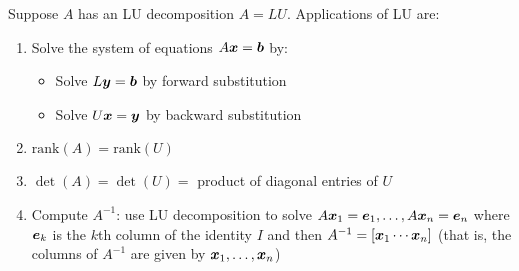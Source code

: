 \begin{note} Suppose $A$ has an LU decomposition $A = LU$. Applications of LU are:
\begin{enumerate}
\item Solve the system of equations $A \boldsymbol{x} = \boldsymbol{b}$ by:
\begin{itemize}
\item Solve $L \boldsymbol{y} = \boldsymbol{b}$ by forward substitution
\item Solve $U \boldsymbol{x} = \boldsymbol{y}$ by backward substitution
\end{itemize} 
\item $\mathrm{rank}(A) = \mathrm{rank}(U)$
\item $\det(A) = \det(U) =$ product of diagonal entries of $U$
\item Compute $A^{-1}$: use LU decomposition to solve $A \boldsymbol{x}_1 = \boldsymbol{e}_1, \dots, A \boldsymbol{x}_n = \boldsymbol{e}_n$ where $\boldsymbol{e}_k$ is the $k$th column of the identity $I$ and then $A^{-1} = [\boldsymbol{x}_1 \cdots \boldsymbol{x}_n]$ (that is, the columns of $A^{-1}$ are given by $\boldsymbol{x}_1, \dots, \boldsymbol{x}_n$)
\end{enumerate}
\end{note}

